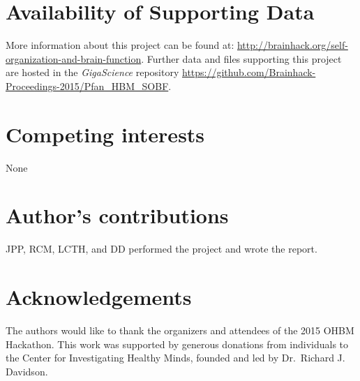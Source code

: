 \documentclass[twocolumn]{bmcart}%
\begin{document}
\begin{backmatter}

\section*{Availability of Supporting Data}
More information about this project can be found at: 
\url{http://brainhack.org/self-organization-and-brain-function}. 
Further data and files supporting this project are hosted in the 
\emph{GigaScience} repository 
\url{https://github.com/Brainhack-Proceedings-2015/Pfan_HBM_SOBF}.

\section*{Competing interests}
None

\section*{Author's contributions}
JPP, RCM, LCTH, and DD performed the project and wrote the report.

\section*{Acknowledgements}
The authors would like to thank the organizers and attendees of the 2015
OHBM Hackathon. This work was supported by generous donations from
individuals to the Center for Investigating Healthy Minds, founded and
led by Dr.~Richard J. Davidson.

  
  


\end{backmatter}
\end{document}
